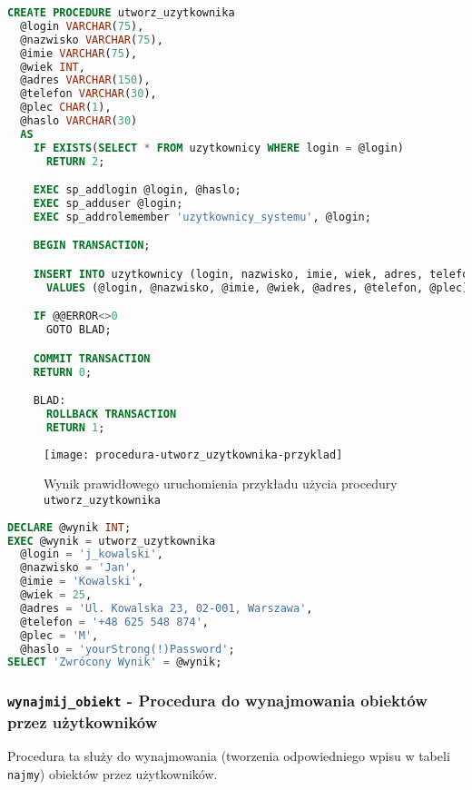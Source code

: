\begin{lstlisting}[language=SQL, caption={Skrypt tworzący procedurę składowaną \texttt{utworz\_uzytkownika}}, label={lst:procedura-utworz_uzytkownika}]
CREATE PROCEDURE utworz_uzytkownika
  @login VARCHAR(75),
  @nazwisko VARCHAR(75),
  @imie VARCHAR(75),
  @wiek INT,
  @adres VARCHAR(150),
  @telefon VARCHAR(30),
  @plec CHAR(1),
  @haslo VARCHAR(30)
  AS
    IF EXISTS(SELECT * FROM uzytkownicy WHERE login = @login)
      RETURN 2;

    EXEC sp_addlogin @login, @haslo;
    EXEC sp_adduser @login;
    EXEC sp_addrolemember 'uzytkownicy_systemu', @login;

    BEGIN TRANSACTION;

    INSERT INTO uzytkownicy (login, nazwisko, imie, wiek, adres, telefon, plec)
      VALUES (@login, @nazwisko, @imie, @wiek, @adres, @telefon, @plec);

    IF @@ERROR<>0
      GOTO BLAD;

    COMMIT TRANSACTION
    RETURN 0;

    BLAD:
      ROLLBACK TRANSACTION
      RETURN 1;
\end{lstlisting}

\begin{figure}[h]
	\centering
    \texttt{[image: procedura-utworz\_uzytkownika-przyklad]}
	\caption{Wynik prawidłowego uruchomienia przykładu użycia procedury \texttt{utworz\_uzytkownika}}
	\label{fig:lista_niepopularnych_obiektow}
\end{figure}

\begin{lstlisting}[language=SQL, caption={Przykład użycia procedury \texttt{utworz\_uzytkownika}}, label={lst:procedura-utworz_uzytkownika-przyklad}]
DECLARE @wynik INT;
EXEC @wynik = utworz_uzytkownika
  @login = 'j_kowalski',
  @nazwisko = 'Jan',
  @imie = 'Kowalski',
  @wiek = 25,
  @adres = 'Ul. Kowalska 23, 02-001, Warszawa',
  @telefon = '+48 625 548 874',
  @plec = 'M',
  @haslo = 'yourStrong(!)Password';
SELECT 'Zwrócony Wynik' = @wynik;
\end{lstlisting}

\subsubsection{\texttt{wynajmij\_obiekt} - Procedura do wynajmowania obiektów przez użytkowników}

Procedura ta służy do wynajmowania (tworzenia odpowiedniego wpisu w tabeli \texttt{najmy}) obiektów przez użytkowników.

